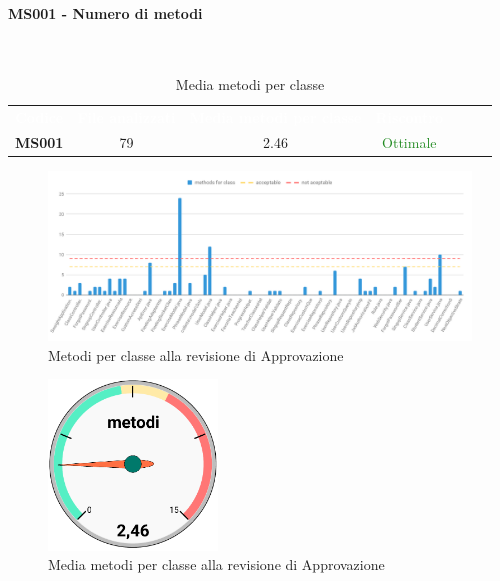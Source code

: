 \paragraph{MS001 - Numero di metodi}\mbox{}\\[0,3cm]
    \begin{table}[H]
        \centering
        \begin{tabular}{ccccccc}
            \rowcolor{greySWEight}
            \textcolor{white}{\textbf{Codice}} &
            \textcolor{white}{\textbf{File analizzati}}&
            \textcolor{white}{\textbf{Media metodi per classe}}&
            \textcolor{white}{\textbf{Riscontro}}\\
            \textbf{MS001} & 79 & 2.46 & \textcolor{ForestGreen}{Ottimale}\\
        \end{tabular}
        \caption{Media metodi per classe}
    \end{table}

    \begin{figure}[H]
        \centering
        \includegraphics[width=165mm]{sez/App_Esito/Approvazione/graph/metodi.pdf}
        \caption{Metodi per classe alla revisione di Approvazione}
    \end{figure}

    \begin{figure}[H]
        \centering
        \includegraphics[width=45mm]{sez/App_Esito/Approvazione/graph/metodiCruscotto.pdf}
        \caption{Media metodi per classe alla revisione di Approvazione}
    \end{figure}

